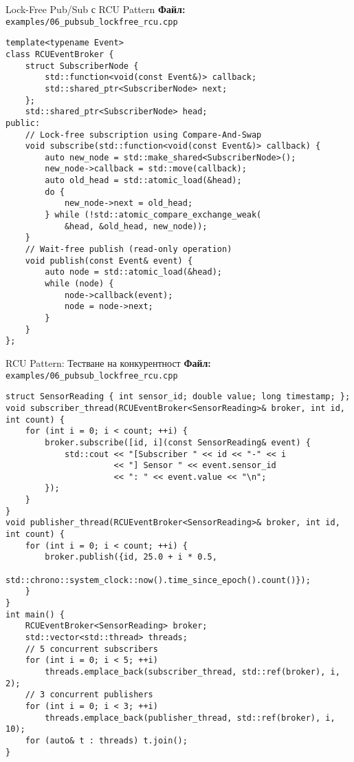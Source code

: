 \documentclass[aspectratio=169]{beamer}
\begin{document}
\begin{frame}[fragile]{Lock-Free Pub/Sub с RCU Pattern}
\textbf{Файл:} \texttt{examples/06\_pubsub\_lockfree\_rcu.cpp}
\begin{lstlisting}[basicstyle=\ttfamily\tiny]
template<typename Event>
class RCUEventBroker {
    struct SubscriberNode {
        std::function<void(const Event&)> callback;
        std::shared_ptr<SubscriberNode> next;
    };
    std::shared_ptr<SubscriberNode> head;
public:
    // Lock-free subscription using Compare-And-Swap
    void subscribe(std::function<void(const Event&)> callback) {
        auto new_node = std::make_shared<SubscriberNode>();
        new_node->callback = std::move(callback);
        auto old_head = std::atomic_load(&head);
        do {
            new_node->next = old_head;
        } while (!std::atomic_compare_exchange_weak(
            &head, &old_head, new_node));
    }
    // Wait-free publish (read-only operation)
    void publish(const Event& event) {
        auto node = std::atomic_load(&head);
        while (node) {
            node->callback(event);
            node = node->next;
        }
    }
};
\end{lstlisting}
\end{frame}

\begin{frame}[fragile]{RCU Pattern: Тестване на конкурентност}
\textbf{Файл:} \texttt{examples/06\_pubsub\_lockfree\_rcu.cpp}
\begin{lstlisting}[basicstyle=\ttfamily\tiny]
struct SensorReading { int sensor_id; double value; long timestamp; };
void subscriber_thread(RCUEventBroker<SensorReading>& broker, int id, int count) {
    for (int i = 0; i < count; ++i) {
        broker.subscribe([id, i](const SensorReading& event) {
            std::cout << "[Subscriber " << id << "-" << i 
                      << "] Sensor " << event.sensor_id 
                      << ": " << event.value << "\n";
        });
    }
}
void publisher_thread(RCUEventBroker<SensorReading>& broker, int id, int count) {
    for (int i = 0; i < count; ++i) {
        broker.publish({id, 25.0 + i * 0.5, 
                       std::chrono::system_clock::now().time_since_epoch().count()});
    }
}
int main() {
    RCUEventBroker<SensorReading> broker;
    std::vector<std::thread> threads;
    // 5 concurrent subscribers
    for (int i = 0; i < 5; ++i)
        threads.emplace_back(subscriber_thread, std::ref(broker), i, 2);
    // 3 concurrent publishers
    for (int i = 0; i < 3; ++i)
        threads.emplace_back(publisher_thread, std::ref(broker), i, 10);
    for (auto& t : threads) t.join();
}
\end{lstlisting}
\end{frame}
\end{document}
